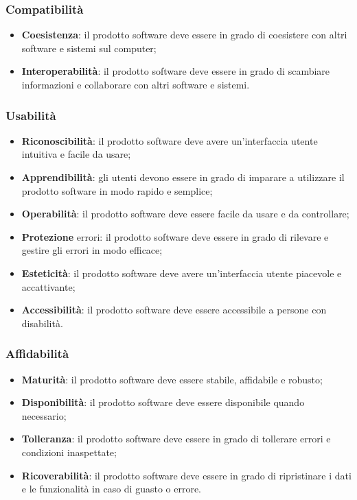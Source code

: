 \subsubsection{Compatibilità}
\begin{itemize}
    \item \textbf{Coesistenza}: il prodotto software deve essere in grado di coesistere con altri software e sistemi sul computer;
    \item \textbf{Interoperabilità}: il prodotto software deve essere in grado di scambiare informazioni e collaborare con altri software e sistemi.
\end{itemize}
\subsubsection{Usabilità}
\begin{itemize}
    \item \textbf{Riconoscibilità}: il prodotto software deve avere un'interfaccia utente intuitiva e facile da usare;
    \item \textbf{Apprendibilità}: gli utenti devono essere in grado di imparare a utilizzare il prodotto software in modo rapido e semplice;
    \item \textbf{Operabilità}: il prodotto software deve essere facile da usare e da controllare;
    \item \textbf{Protezione} errori: il prodotto software deve essere in grado di rilevare e gestire gli errori in modo efficace;
    \item \textbf{Esteticità}: il prodotto software deve avere un'interfaccia utente piacevole e accattivante;
    \item \textbf{Accessibilità}: il prodotto software deve essere accessibile a persone con disabilità.
\end{itemize}
\subsubsection{Affidabilità}
\begin{itemize}
    \item \textbf{Maturità}: il prodotto software deve essere stabile, affidabile e robusto;
    \item \textbf{Disponibilità}: il prodotto software deve essere disponibile quando necessario;
    \item \textbf{Tolleranza}: il prodotto software deve essere in grado di tollerare errori e condizioni inaspettate;
    \item \textbf{Ricoverabilità}: il prodotto software deve essere in grado di ripristinare i dati e le funzionalità in caso di guasto o errore.
\end{itemize}
